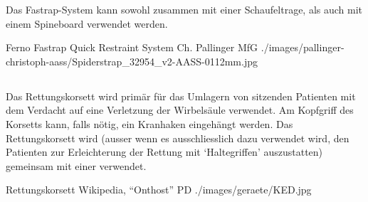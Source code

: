 \Text{\TxBeschreibung}
{%
Das Fastrap{\texttrademark}-System kann sowohl zusammen mit
einer Schaufeltrage, als auch mit einem Spineboard verwendet
werden. 
% 
}{

}
{}
{}
{}




\Picture
{Ferno Fastrap{\texttrademark} Quick Restraint System}%
{}%
{}%
{Ch. Pallinger}%
{MfG}%
{./images/pallinger-christoph-aass/Spiderstrap_32954_v2-AASS-0112mm.jpg}%
{}%
{}%








% 
\subsection{}
\label{topic:rettungskorsett-anwendung}
\label{topic:rettungskorsett-beschreibung}




\Text{\TxBeschreibung}
{%
Das Rettungskorsett wird primär für das Umlagern von
sitzenden Patienten mit dem Verdacht auf eine Verletzung der
Wirbelsäule verwendet. Am Kopfgriff des
Korsetts kann, falls nötig, ein Kranhaken eingehängt
werden. Das Rettungskorsett wird (ausser wenn es
ausschliesslich dazu verwendet wird, den Patienten 
zur Erleichterung der Rettung mit
\enquote*{Haltegriffen} auszustatten) gemeinsam mit einer
 verwendet.
}{

}
{}
{}
{}




\Picture
{Rettungskorsett}%
{}%
{}%
{Wikipedia, \enquote{Onthost}}%
{PD}%
{./images/geraete/KED.jpg}%
{}%
{}%

